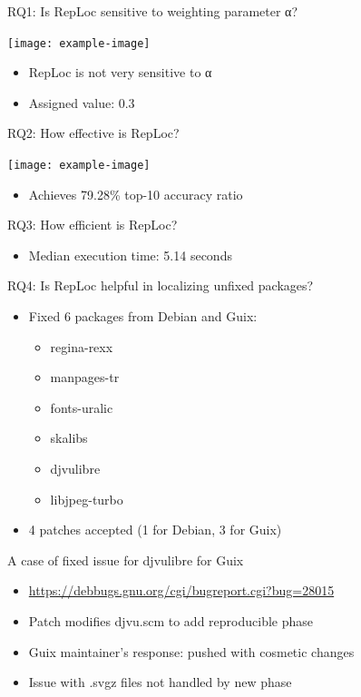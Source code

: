 \documentclass{beamer}
\begin{document}
\begin{frame}{RQ1: Is RepLoc sensitive to weighting parameter α?}
\begin{center}
\texttt{[image: example-image]}
\end{center}
\begin{itemize}
\item RepLoc is not very sensitive to α
\item Assigned value: 0.3
\end{itemize}
\end{frame}

\begin{frame}{RQ2: How effective is RepLoc?}
\begin{center}
\texttt{[image: example-image]}
\end{center}
\begin{itemize}
\item Achieves 79.28\% top-10 accuracy ratio
\end{itemize}
\end{frame}

\begin{frame}{RQ3: How efficient is RepLoc?}
\begin{itemize}
\item Median execution time: 5.14 seconds
\end{itemize}
\end{frame}

\begin{frame}{RQ4: Is RepLoc helpful in localizing unfixed packages?}
\begin{itemize}
\item Fixed 6 packages from Debian and Guix:
\begin{itemize}
\item regina-rexx
\item manpages-tr
\item fonts-uralic
\item skalibs
\item djvulibre
\item libjpeg-turbo
\end{itemize}
\item 4 patches accepted (1 for Debian, 3 for Guix)
\end{itemize}
\end{frame}

\begin{frame}{A case of fixed issue for djvulibre for Guix}
\begin{itemize}
\item \url{https://debbugs.gnu.org/cgi/bugreport.cgi?bug=28015}
\item Patch modifies djvu.scm to add reproducible phase
\item Guix maintainer's response: pushed with cosmetic changes
\item Issue with .svgz files not handled by new phase
\end{itemize}
\end{frame}
\end{document}
